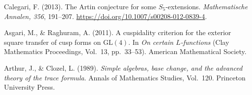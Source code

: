 Calegari, F. (2013). The Artin conjecture for some
$S_5$-extensions. \emph{Mathematische Annalen, 356},
191--207. \url{https://doi.org/10.1007/s00208-012-0839-4}.

Asgari, M., \& Raghuram, A. (2011).
A cuspidality criterion for the exterior square transfer
of cusp forms on $\mathrm{GL}(4)$.
In \emph{On certain $L$-functions} (Clay Mathematics
Proceedings, Vol.~13, pp.~33--53).
American Mathematical Society.

Arthur, J., \& Clozel, L. (1989).
\emph{Simple algebras, base change, and the advanced
theory of the trace formula}.
Annals of Mathematics Studies, Vol.~120.
Princeton University Press.
